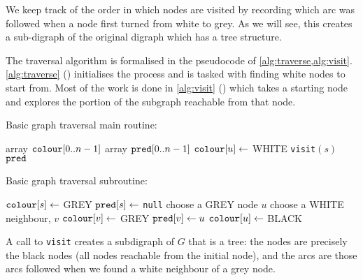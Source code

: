 We keep track of the order in which nodes are visited by recording which arc was followed when a node first turned from white to grey. 
As we will see, this creates a sub-digraph of the original digraph which has a tree structure.

The traversal algorithm is formalised in the pseudocode of \cref{alg:traverse,alg:visit}.  
\cref{alg:traverse} () initialises the process and is tasked with finding white nodes to start from. 
Most of the work is done in \cref{alg:visit} () which takes a starting node 
and explores the portion of the subgraph reachable from that node.

\begin{algorithm}[H]
  \caption{Basic graph traversal main routine: }
  \label{alg:traverse}
\begin{algorithmic}[1]
	\State array $\operatorname{\text{\texttt{colour}}}[0..n-1]$ 
	\State array $\operatorname{\text{\texttt{pred}}}[0..n-1]$ 
	 
		\State $\operatorname{\text{\texttt{colour}}}[u] \gets $ WHITE 
	\EndFor
	  
			\State \texttt{visit}$(s)$ 
		\EndIf
	\EndFor
	\Return $\operatorname{\text{\texttt{pred}}}$ 
\EndFunction
\end{algorithmic}
\end{algorithm}

\begin{algorithm}[H]
  \caption{Basic graph traversal subroutine: }
   \label{alg:visit}
\begin{algorithmic}[1]
	\State  $\operatorname{\text{\texttt{colour}}}[s] \gets$ GREY 
	\State $\operatorname{\text{\texttt{pred}}}[s] \gets$ \texttt{null} 
	 
		\State choose a GREY node $u$ 
			\State choose a WHITE neighbour, $v$ 
			\State $\operatorname{\text{\texttt{colour}}}[v] \gets $ GREY 
			\State $\operatorname{\text{\texttt{pred}}}[v] \gets u$ 
		\Else
			\State $\operatorname{\text{\texttt{colour}}}[u] \gets $ BLACK 
		\EndIf
	\EndWhile
\EndFunction
\end{algorithmic}
\end{algorithm}

A call to \texttt{visit} creates a subdigraph of $G$ that is a tree: 
the nodes are precisely the black nodes (all nodes reachable from the initial node), 
and the arcs are those arcs followed when we found a white neighbour of a grey node. 


